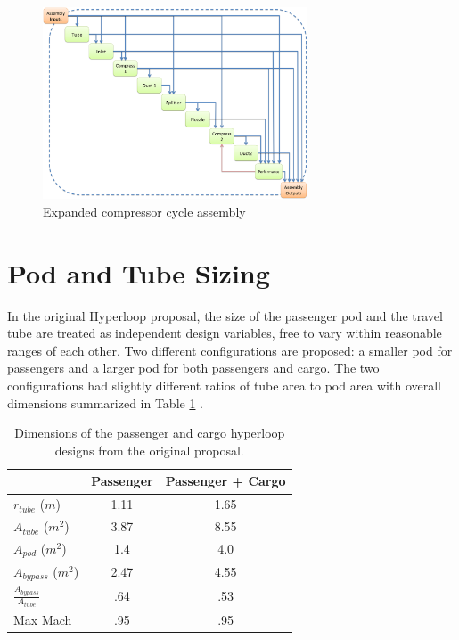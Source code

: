 \documentclass[heading.tex]{subfiles}
\begin{document}
\begin{figure}[H]
\centering
\includegraphics[width=0.7\textwidth]{images/compAssembly.png}
\caption{Expanded compressor cycle assembly}
\label{f:compressorXDSM}
\end{figure}


\section{Pod and Tube Sizing}
\label{s:sizing}

In the original Hyperloop proposal, the size of the passenger pod and the travel tube are treated as independent design variables, 
free to vary within reasonable ranges of each other. Two different configurations are proposed:
a smaller pod for passengers and a larger pod for both passengers and cargo.
The two configurations had slightly different ratios of tube area to pod area with overall dimensions summarized 
in Table \ref{t:hyperbase} . 

\begin{table}
  \centering
  \caption{Dimensions of the passenger and cargo hyperloop designs from the original proposal. }
  \label{t:hyperbase}
  \begin{tabular}{l c c}
    \hline
                                  &  Passenger       & Passenger + Cargo \\ \hline
    $r_{tube}$ ($m$)              &        1.11      &     1.65  \\
    $A_{tube}$  ($m^2$)           &        3.87      &     8.55  \\
    $A_{pod}$ ($m^2$)             &        1.4       &     4.0   \\ 
    $A_{bypass}$ ($m^2$)          &        2.47      &     4.55  \\ 
    $\frac{A_{bypass}}{A_{tube}}$ &        .64       &     .53   \\
    Max Mach                      &        .95       &     .95   \\
    \hline
  \end{tabular}
\end{table}
\end{document}
